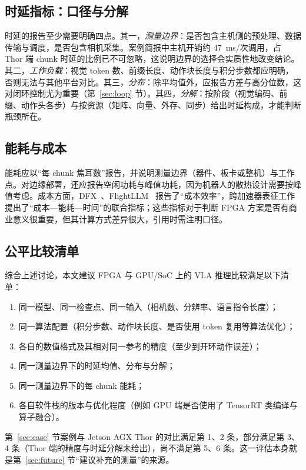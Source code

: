 \documentclass[a4paper,10.5pt]{ctexart}
\begin{document}
\subsection{时延指标：口径与分解}

时延的报告至少需要明确四点。其一，\emph{测量边界}：是否包含主机侧的预处理、数据传输与调度，是否包含相机采集。案例简报中主机开销约 47~ms/次调用，占 Thor 端 chunk 时延的比例已不可忽略，这说明边界的选择会实质性地改变结论。其二，\emph{工作负载}：视觉 token 数、前缀长度、动作块长度与积分步数都应明确，否则无法与其他平台对比。其三，\emph{分布}：除平均值外，应报告方差与高分位数，这对闭环控制尤为重要（第~\ref{sec:loop} 节）。其四，\emph{分解}：按阶段（视觉编码、前缀、动作头各步）与按资源（矩阵、向量、外存、同步）给出时延构成，才能判断瓶颈所在。

\subsection{能耗与成本}

能耗应以“每 chunk 焦耳数”报告，并说明测量边界（器件、板卡或整机）与工作点。对边缘部署，还应报告空闲功耗与峰值功耗，因为机器人的散热设计需要按峰值考虑。成本方面，DFX~\cite{dfx}、FlightLLM~\cite{flightllm} 报告了“成本效率”，跨加速器表征工作~\cite{xpuvla} 提出了“成本—能耗—时间”的联合指标；这些指标对于判断 FPGA 方案是否有商业意义很重要，但其计算方式差异很大，引用时需注明口径。

\subsection{公平比较清单}

综合上述讨论，本文建议 FPGA 与 GPU/SoC 上的 VLA 推理比较满足以下清单：
\begin{enumerate}
  \item 同一模型、同一检查点、同一输入（相机数、分辨率、语言指令长度）；
  \item 同一算法配置（积分步数、动作块长度、是否使用 token 复用等算法优化）；
  \item 各自的数值格式及其相对同一参考的精度（至少到开环动作误差）；
  \item 同一测量边界下的时延均值、分布与分解；
  \item 同一测量边界下的每 chunk 能耗；
  \item 各自软件栈的版本与优化程度（例如 GPU 端是否使用了 TensorRT 类编译与算子融合）。
\end{enumerate}
第~\ref{sec:case} 节案例与 Jetson AGX Thor 的对比满足第 1、2 条，部分满足第 3、4 条（Thor 端的精度与时延分解未给出），尚不满足第 5、6 条。这一评估本身就是第~\ref{sec:future} 节“建议补充的测量”的来源。
\end{document}
